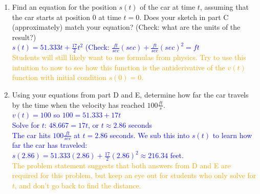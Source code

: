\documentclass{ximera}
\begin{document}
\begin{exercise}
\begin{enumerate}
        \item[E.] Find an equation for the position $s(t)$ of the car at time $t$, assuming that the car starts at position 0 at time $t=0$. Does your sketch in part C (approximately) match your equation? (Check: what are the units of the result?)\\
        \textcolor{blue}{ $s(t)=51.333t+\frac{17}{2}t^2$ (Check: $\frac{ft}{sec}(sec)+\frac{ft}{sec}(sec)^2=ft$ }\\
        \textcolor{orange}{ Students will still likely want to use formulas from physics. Try to use this intuition to now to see how this function is the antiderivative of the $v(t)$ function with initial condition $s(0)=0$.}
        
        \item[F.] Using your equations from part D and E, determine how far the car travels by the time when the velocity has reached $100\frac{ft}{s}$.\\
        \textcolor{blue}{ $v(t)=100$ so $100=51.333+17t$\\
        Solve for $t$: $48.667=17t$, or $t\approx 2.86$ seconds \\
        The car hits $100 \frac{ft}{sec}$ at $t=2.86$ seconds.  We sub this into $s(t)$ to learn how far the car has traveled:\\
        $s(2.86)=51.333(2.86)+\frac{17}{2}(2.86)^2\approx216.34$ feet.}\\
        \textcolor{orange}{ The problem statement suggests that both answers from D and E are required for this problem, but keep an eye out for students who only solve for $t$, and don't go back to find the distance.}
    \end{enumerate}
  \end{exercise}
\end{document}

